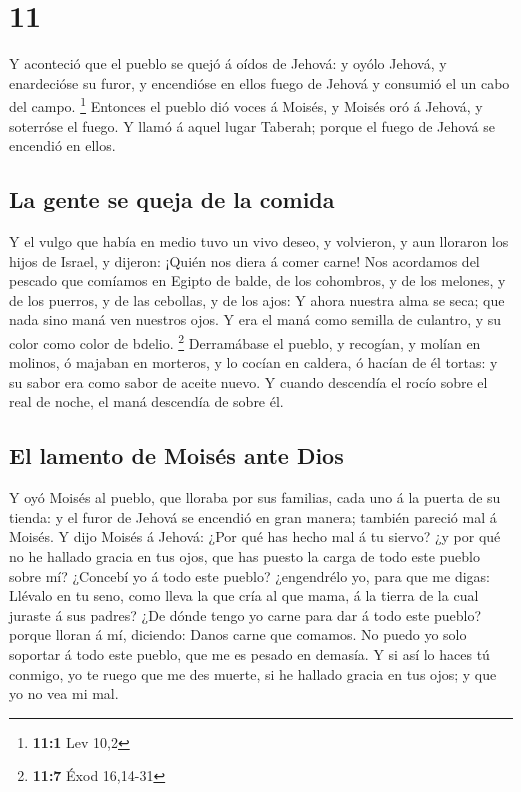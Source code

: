 \hypertarget{section-10}{%
\section{11}\label{section-10}}

 Y aconteció que el pueblo se quejó á oídos de Jehová: y
oyólo Jehová, y enardecióse su furor, y encendióse en ellos fuego de
Jehová y consumió el un cabo del campo. \footnote{\textbf{11:1} Lev 10,2}
 Entonces el pueblo dió voces á Moisés, y Moisés oró á
Jehová, y soterróse el fuego.  Y llamó á aquel lugar
Taberah; porque el fuego de Jehová se encendió en ellos.

\hypertarget{la-gente-se-queja-de-la-comida}{%
\subsection{La gente se queja de la
comida}\label{la-gente-se-queja-de-la-comida}}

 Y el vulgo que había en medio tuvo un vivo deseo, y
volvieron, y aun lloraron los hijos de Israel, y dijeron: ¡Quién nos
diera á comer carne!  Nos acordamos del pescado que
comíamos en Egipto de balde, de los cohombros, y de los melones, y de
los puerros, y de las cebollas, y de los ajos:  Y ahora
nuestra alma se seca; que nada sino maná ven nuestros ojos.
 Y era el maná como semilla de culantro, y su color como
color de bdelio. \footnote{\textbf{11:7} Éxod 16,14-31} 
Derramábase el pueblo, y recogían, y molían en molinos, ó majaban en
morteros, y lo cocían en caldera, ó hacían de él tortas: y su sabor era
como sabor de aceite nuevo.  Y cuando descendía el rocío
sobre el real de noche, el maná descendía de sobre él.

\hypertarget{el-lamento-de-moisuxe9s-ante-dios}{%
\subsection{El lamento de Moisés ante
Dios}\label{el-lamento-de-moisuxe9s-ante-dios}}

 Y oyó Moisés al pueblo, que lloraba por sus familias,
cada uno á la puerta de su tienda: y el furor de Jehová se encendió en
gran manera; también pareció mal á Moisés.  Y dijo Moisés
á Jehová: ¿Por qué has hecho mal á tu siervo? ¿y por qué no he hallado
gracia en tus ojos, que has puesto la carga de todo este pueblo sobre
mí?  ¿Concebí yo á todo este pueblo? ¿engendrélo yo, para
que me digas: Llévalo en tu seno, como lleva la que cría al que mama, á
la tierra de la cual juraste á sus padres?  ¿De dónde
tengo yo carne para dar á todo este pueblo? porque lloran á mí,
diciendo: Danos carne que comamos.  No puedo yo solo
soportar á todo este pueblo, que me es pesado en demasía.
 Y si así lo haces tú conmigo, yo te ruego que me des
muerte, si he hallado gracia en tus ojos; y que yo no vea mi mal.

